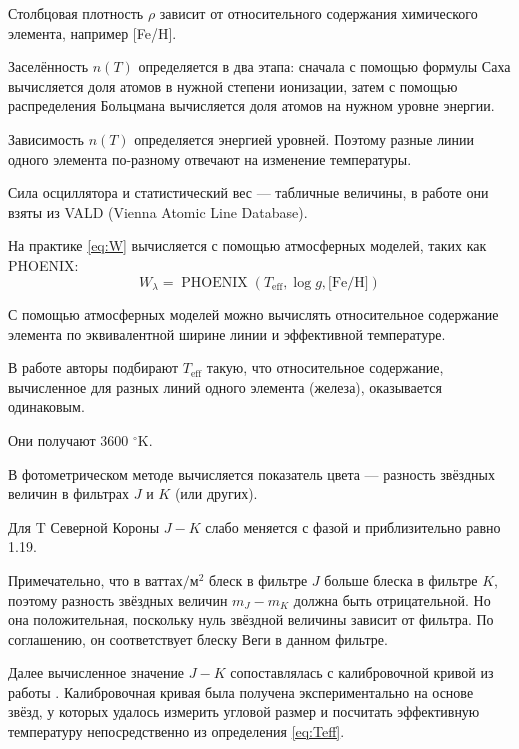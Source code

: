 Столбцовая плотность $\rho$ зависит от относительного содержания химического элемента, например [Fe/H].

Заселённость $n(T)$ определяется в два этапа: сначала с помощью формулы Саха вычисляется доля атомов в нужной степени ионизации, затем с помощью распределения Больцмана вычисляется доля атомов на нужном уровне энергии. 

Зависимость $n(T)$ определяется энергией уровней. Поэтому разные линии одного элемента по-разному отвечают на изменение температуры.

Сила осциллятора и статистический вес --- табличные величины, в работе \cite{TCRBtemperature} они взяты из VALD (Vienna Atomic Line Database).

На практике \eqref{eq:W} вычисляется с помощью атмосферных моделей, таких как PHOENIX:
\begin{equation}
W_\lambda = \operatorname{PHOENIX}(T_\text{eff}, \log g, \text{[Fe/H]})
\label{eq:W_PHOENIX}
\end{equation}

С помощью атмосферных моделей можно вычислять относительное содержание элемента по эквивалентной ширине линии и эффективной температуре.

В работе \cite{TCRBtemperature} авторы подбирают $T_\text{eff}$ такую, что относительное содержание, вычисленное для разных линий одного элемента (железа), оказывается одинаковым.

Они получают 3600 ${}^\circ$K.



В фотометрическом методе вычисляется показатель цвета --- разность звёздных величин в фильтрах $J$ и $K$ (или других).

Для T Северной Короны $J - K$ слабо меняется с фазой и приблизительно равно 1.19.

Примечательно, что в $\text{ваттах}/\text{м}^2$ блеск в фильтре $J$ больше блеска в фильтре $K$, поэтому разность звёздных величин $m_J - m_K$ должна быть отрицательной. Но она положительная, поскольку нуль звёздной величины зависит от фильтра. По соглашению, он соответствует блеску Веги в данном фильтре.

Далее вычисленное значение $J - K$ сопоставлялась с калибровочной кривой из работы \cite{AlonsoCalibration}. Калибровочная кривая была получена экспериментально на основе звёзд, у которых удалось измерить угловой размер и посчитать эффективную температуру непосредственно из определения \eqref{eq:Teff}.

